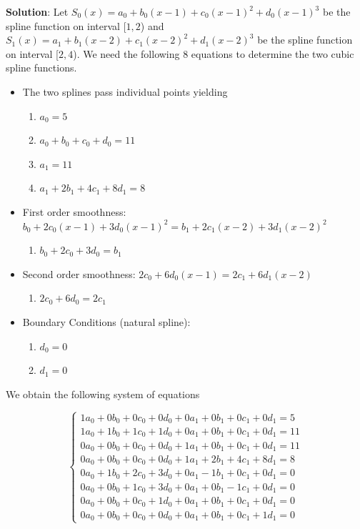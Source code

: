 \documentclass[
]{book}
\providecommand{\tightlist}{%
  \setlength{\itemsep}{0pt}\setlength{\parskip}{0pt}}
\begin{document}
\textbf{Solution}: Let \(S_0(x) = a_0 + b_0(x-1) + c_0(x-1)^2 + d_0(x-1)^3\) be the spline function on interval {[}\(1, 2\)) and \(S_1(x) = a_1 + b_1(x-2) + c_1(x-2)^2 + d_1(x-2)^3\) be the spline function on interval {[}\(2, 4\)). We need the following 8 equations to determine the two cubic spline functions.

\begin{itemize}
\item
  The two splines pass individual points yielding

  \begin{enumerate}
  \def\labelenumi{\arabic{enumi}.}
  \item
    \(a_0 = 5\)
  \item
    \(a_0 + b_0 + c_0 + d_0 = 11\)
  \item
    \(a_1 = 11\)
  \item
    \(a_1 + 2b_1 + 4c_1 + 8d_1 = 8\)
  \end{enumerate}
\item
  First order smoothness: \(b_0 + 2c_0(x-1) +3d_0(x-1)^2 = b_1 + 2c_1(x-2) +3d_1(x-2)^2\)

  \begin{enumerate}
  \def\labelenumi{\arabic{enumi}.}
  \setcounter{enumi}{4}
  \tightlist
  \item
    \(b_0 +2c_0 + 3d_0= b_1\)
  \end{enumerate}
\item
  Second order smoothness: \(2c_0 +6d_0(x-1) = 2c_1 +6d_1(x-2)\)

  \begin{enumerate}
  \def\labelenumi{\arabic{enumi}.}
  \setcounter{enumi}{5}
  \tightlist
  \item
    \(2c_0 +6d_0= 2c_1\)
  \end{enumerate}
\item
  Boundary Conditions (natural spline):

  \begin{enumerate}
  \def\labelenumi{\arabic{enumi}.}
  \setcounter{enumi}{6}
  \item
    \(d_0 = 0\)
  \item
    \(d_1 = 0\)
  \end{enumerate}
\end{itemize}

We obtain the following system of equations

\[
\begin{cases} 
1a_0 + 0b_0 +0c_0 +0d_0 + 0a_1 + 0b_1 + 0c_1 +0d_1 = 5  \\
1a_0 + 1b_0 +1c_0 +1d_0 + 0a_1 + 0b_1 + 0c_1 +0d_1 = 11 \\ 
0a_0 + 0b_0 +0c_0 +0d_0 + 1a_1 + 0b_1 + 0c_1 +0d_1 = 11  \\
0a_0 + 0b_0 +0c_0 +0d_0 + 1a_1 + 2b_1 + 4c_1 +8d_1 = 8  \\
0a_0 + 1b_0 +2c_0 +3d_0 + 0a_1 - 1b_1 + 0c_1 +0d_1 = 0  \\
0a_0 + 0b_0 +1c_0 +3d_0 + 0a_1 + 0b_1 - 1c_1 +0d_1 = 0  \\
0a_0 + 0b_0 +0c_0 +1d_0 + 0a_1 + 0b_1 + 0c_1 +0d_1 = 0  \\
0a_0 + 0b_0 +0c_0 +0d_0 + 0a_1 + 0b_1 + 0c_1 +1d_1 = 0  
\end{cases}
\]
\end{document}
